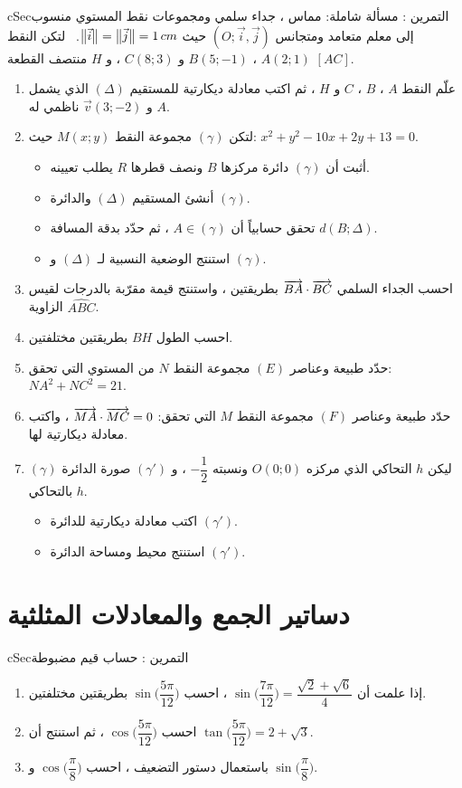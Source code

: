 \documentclass[12pt,a4paper]{article}
\newenvironment{BOX}[2]{\begin{otherlanguage}{english}\begin{arbox}{#1}{#2}}{\end{arbox}\end{otherlanguage}}
\newcounter{exo}
\newenvironment{tamrin}[1]{\stepcounter{exo}\begin{BOX}{cSec}{التمرين \theexo: #1}}{\end{BOX}}
\newenvironment{sq}{\begin{itemize}[leftmargin=2.4em,itemsep=3pt]}{\end{itemize}}
\newcommand{\qa}{\item[(أ)]}\newcommand{\qb}{\item[(ب)]}\newcommand{\qc}{\item[(جـ)]}\newcommand{\qd}{\item[(د)]}\newcommand{\qe}{\item[(هـ)]}
\begin{document}
\begin{tamrin}{مسألة شاملة: مماس ، جداء سلمي ومجموعات نقط}
المستوي منسوب إلى معلم متعامد ومتجانس $(O;\vec i,\vec j)$ حيث $\big\|\vec i\big\|=\big\|\vec j\big\|=1\,cm$. \ لتكن النقط $A(2;1)$ ، $B(5;-1)$ و $C(8;3)$ ، و $H$ منتصف القطعة $[AC]$.
\begin{enumerate}
\item علّم النقط $A$ ، $B$ ، $C$ و $H$ ، ثم اكتب معادلة ديكارتية للمستقيم $(\Delta)$ الذي يشمل $A$ و $\vec v(3;-2)$ ناظمي له.
\item لتكن $(\gamma)$ مجموعة النقط $M(x;y)$ حيث: $x^2+y^2-10x+2y+13=0$.
\begin{sq}
\qa أثبت أن $(\gamma)$ دائرة مركزها $B$ ونصف قطرها $R$ يطلب تعيينه.
\qb أنشئ المستقيم $(\Delta)$ والدائرة $(\gamma)$.
\qc تحقق حسابياً أن $A\in(\gamma)$ ، ثم حدّد بدقة المسافة $d(B;\Delta)$.
\qd استنتج الوضعية النسبية لـ $(\Delta)$ و $(\gamma)$.
\end{sq}
\item احسب الجداء السلمي $\overrightarrow{BA}\cdot\overrightarrow{BC}$ بطريقتين ، واستنتج قيمة مقرّبة بالدرجات لقيس الزاوية $\widehat{ABC}$.
\item احسب الطول $BH$ بطريقتين مختلفتين.
\item حدّد طبيعة وعناصر $(E)$ مجموعة النقط $N$ من المستوي التي تحقق: $NA^2+NC^2=21$.
\item حدّد طبيعة وعناصر $(F)$ مجموعة النقط $M$ التي تحقق: $\overrightarrow{MA}\cdot\overrightarrow{MC}=0$ ، واكتب معادلة ديكارتية لها.
\item ليكن $h$ التحاكي الذي مركزه $O(0;0)$ ونسبته $-\dfrac12$ ، و $(\gamma')$ صورة الدائرة $(\gamma)$ بالتحاكي $h$.
\begin{sq}
\qa اكتب معادلة ديكارتية للدائرة $(\gamma')$.
\qb استنتج محيط ومساحة الدائرة $(\gamma')$.
\end{sq}
\end{enumerate}
\end{tamrin}

\section{دساتير الجمع والمعادلات المثلثية}
\begin{tamrin}{حساب قيم مضبوطة}
\begin{enumerate}
\item إذا علمت أن $\sin\Big(\dfrac{7\pi}{12}\Big)=\dfrac{\sqrt2+\sqrt6}{4}$ ، احسب $\sin\Big(\dfrac{5\pi}{12}\Big)$ بطريقتين مختلفتين.
\item احسب $\cos\Big(\dfrac{5\pi}{12}\Big)$ ، ثم استنتج أن $\tan\Big(\dfrac{5\pi}{12}\Big)=2+\sqrt3$.
\item باستعمال دستور التضعيف ، احسب $\cos\Big(\dfrac{\pi}{8}\Big)$ و $\sin\Big(\dfrac{\pi}{8}\Big)$.
\end{enumerate}
\end{tamrin}
\end{document}
